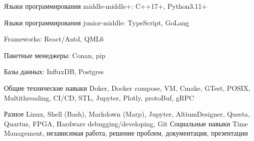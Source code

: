 

\begin{cvskills}

  \cvskill
    {Языки программирования middle-middle+:}
    {C++17+, Python3.11+}

  \cvskill
    {Языки программирования junior-middle:}
    {TypeScript, GoLang}

  \cvskill
    {Frameworks:}
    {React/Antd, QML6}

  \cvskill
    {Пакетные менеджеры:}
    {Conan, pip}

  \cvskill
    {Базы данных:}
    {InfluxDB, Postgres}

  \cvskill
    {Общие технические навыки} %
    {Doker, Docker compose, VM, Cmake, GTest, POSIX, Multithreading, CI/CD, STL, Jupyter, Plotly, protoBuf, gRPC} %

  \cvskill
    {Разное} %
    {Linux, Shell (Bash), Markdown (Marp), Jupyter, AltiumDesigner, Questa, Quartus, FPGA, Hardware debugging/developing, Git} %
  \cvskill
    {Социальные навыки} %
    {Time Management, независимая работа, решение проблем, документация, презентации} %

\end{cvskills}

